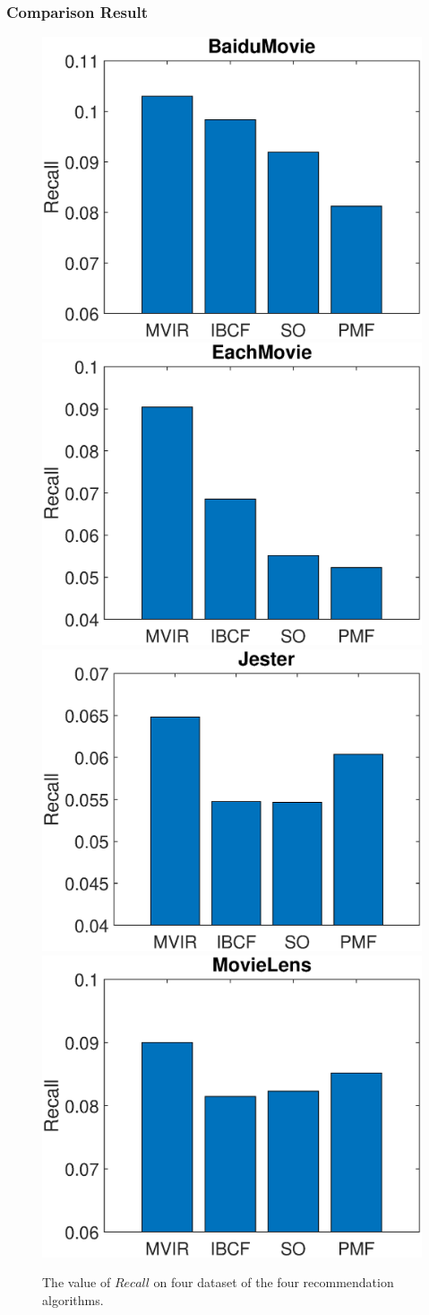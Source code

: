 \documentclass{beamer}
\begin{document}
\begin{frame}
\frametitle{Comparison Result}
\begin{figure}[!t]
\centering
{\includegraphics[width=0.24\linewidth]{Figures/Baidu_compare_recall.eps}\label{fig:comparerbaidu}}
{\includegraphics[width=0.24\linewidth]{Figures/EachMovie_compare_recall.eps}\label{fig:comparereachmovie}}
{\includegraphics[width=0.24\linewidth]{Figures/Jester_compare_recall.eps}\label{fig:comparerjester}}
{\includegraphics[width=0.24\linewidth]{Figures/MovieLens_compare_recall.eps}\label{fig:comparermovielens}}
\caption{The value of $Recall$ on four dataset of the four recommendation algorithms.}
\label{fig:comparer}



\end{figure}
\end{frame}
\end{document}
